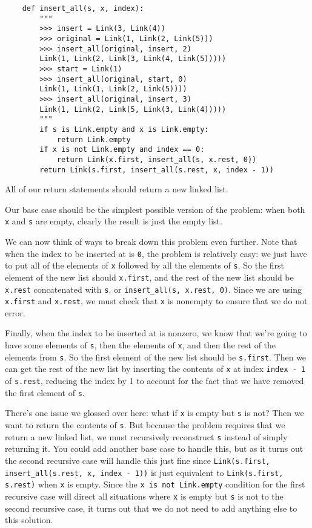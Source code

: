 \begin{solution}[0.6in]
\begin{lstlisting}
    def insert_all(s, x, index):
        """
        >>> insert = Link(3, Link(4))
        >>> original = Link(1, Link(2, Link(5)))
        >>> insert_all(original, insert, 2)
        Link(1, Link(2, Link(3, Link(4, Link(5)))))
        >>> start = Link(1)
        >>> insert_all(original, start, 0)
        Link(1, Link(1, Link(2, Link(5))))
        >>> insert_all(original, insert, 3)
        Link(1, Link(2, Link(5, Link(3, Link(4)))))
        """
        if s is Link.empty and x is Link.empty:
            return Link.empty
        if x is not Link.empty and index == 0:
            return Link(x.first, insert_all(s, x.rest, 0))
        return Link(s.first, insert_all(s.rest, x, index - 1))
\end{lstlisting}
    All of our return statements should return a new linked list. 

    Our base case should be the simplest possible version of the problem: when both \lstinline{x} and \lstinline{s} are empty, clearly the result is just the empty list. 

    We can now think of ways to break down this problem even further. Note that when the index to be inserted at is \lstinline{0}, the problem is relatively easy: we just have to put all of the elements of \lstinline{x} followed by all the elements of \lstinline{s}. So the first element of the new list should \lstinline{x.first}, and the rest of the new list should be \lstinline{x.rest} concatenated with \lstinline{s}, or \lstinline{insert_all(s, x.rest, 0)}. Since we are using \lstinline{x.first} and \lstinline{x.rest}, we must check that \lstinline{x} is nonempty to ensure that we do not error.  

    Finally, when the index to be inserted at is nonzero, we know that we're going to have some elements of \lstinline{s}, then the elements of \lstinline{x}, and then the rest of the elements from \lstinline{s}. So the first element of the new list should be \lstinline{s.first}. Then we can get the rest of the new list by inserting the contents of \lstinline{x} at index \lstinline{index - 1} of \lstinline{s.rest}, reducing the index by 1 to account for the fact that we have removed the first element of \lstinline{s}.
    
    There's one issue we glossed over here: what if \lstinline{x} is empty but \lstinline{s} is not? Then we want to return the contents of \lstinline{s}. But because the problem requires that we return a new linked list, we must recursively reconstruct \lstinline{s} instead of simply returning it. You could add another base case to handle this, but as it turns out the second recursive case will handle this just fine since \lstinline{Link(s.first, insert_all(s.rest, x, index - 1))} is just equivalent to \lstinline{Link(s.first, s.rest)} when \lstinline{x} is empty. Since the \lstinline{x is not Link.empty} condition for the first recursive case will direct all situations where \lstinline{x} is empty but \lstinline{s} is not to the second recursive case, it turns out that we do not need to add anything else to this solution.
    

\end{solution}
